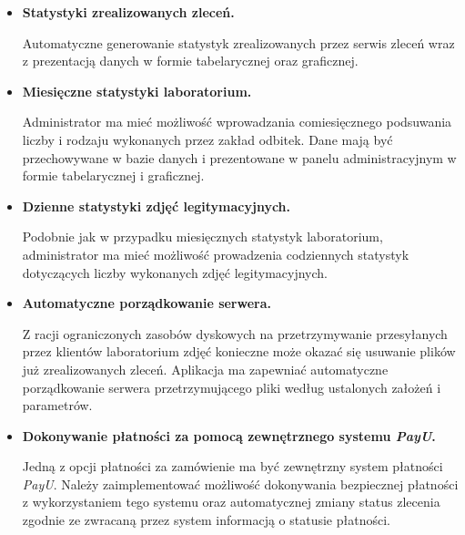 \begin{itemize}
    \item \textbf{Statystyki zrealizowanych zleceń.}
    
    Automatyczne generowanie statystyk zrealizowanych przez serwis zleceń wraz z prezentacją danych w formie tabelarycznej oraz graficznej.
    
    \item \textbf{Miesięczne statystyki laboratorium.}
    
    Administrator ma mieć możliwość wprowadzania comiesięcznego podsuwania liczby i rodzaju wykonanych przez zakład odbitek. Dane mają być przechowywane w bazie danych i prezentowane w panelu administracyjnym w formie tabelarycznej i graficznej.
    
    \item \textbf{Dzienne statystyki zdjęć legitymacyjnych.}
    
    Podobnie jak w przypadku miesięcznych statystyk laboratorium, administrator ma mieć możliwość prowadzenia codziennych statystyk dotyczących liczby wykonanych zdjęć legitymacyjnych.

    \item \textbf{Automatyczne porządkowanie serwera.}

    Z racji ograniczonych zasobów dyskowych na przetrzymywanie przesyłanych przez klientów laboratorium zdjęć konieczne może okazać się usuwanie plików już zrealizowanych zleceń. Aplikacja ma zapewniać automatyczne porządkowanie serwera przetrzymującego pliki według ustalonych założeń i parametrów.
    
    \item \textbf{Dokonywanie płatności za pomocą zewnętrznego systemu \textit{PayU}.}
    
    Jedną z opcji płatności za zamówienie ma być zewnętrzny system płatności \textit{PayU}. Należy zaimplementować możliwość dokonywania bezpiecznej płatności z wykorzystaniem tego systemu oraz automatycznej zmiany status zlecenia zgodnie ze zwracaną przez system informacją o statusie płatności.
    
\end{itemize}

